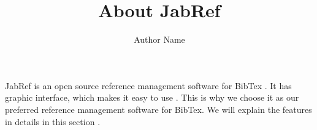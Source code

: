 \documentclass{article}
\begin{document}
	
	\title{About JabRef}
	\author{Author Name}
	
	\maketitle
	
	JabRef is an open source reference management software for BibTex \cite{BESIIICollaboration2014}. It has graphic interface, which makes it easy to use \cite{Apalkov2013,Libby2014}. This is why we choose it as our preferred reference management software for BibTex\cite{Silveira2014}. We will explain the features in details in this section \cite{moveit}.
	
	
	
	
\end{document}

